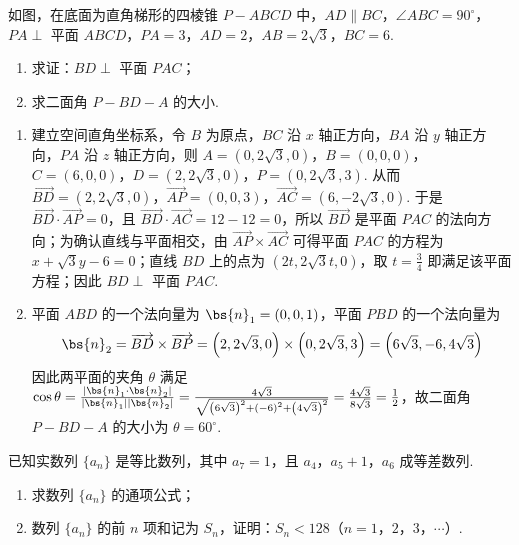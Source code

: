 \begin{problem}
如图，在底面为直角梯形的四棱锥 \(P - ABCD\) 中，\(AD \parallel BC\)，\(\angle ABC = 90^{\circ}\)，\(PA \perp\) 平面 \(ABCD\)，\(PA = 3\)，\(AD = 2\)，\(AB = 2\sqrt{3}\)，\(BC = 6\).

\begin{enumerate}
\item 求证：\(BD \perp\) 平面 \(PAC\)；
\item 求二面角 \(P - BD - A\) 的大小.
\end{enumerate}

\end{problem}

\begin{solution}
\begin{enumerate}
\item 建立空间直角坐标系，令 \(B\) 为原点，\(BC\) 沿 \(x\) 轴正方向，\(BA\) 沿 \(y\) 轴正方向，\(PA\) 沿 \(z\) 轴正方向，则 \(A=\left(0,2\sqrt{3},0\right)\)，\(B=\left(0,0,0\right)\)，\(C=\left(6,0,0\right)\)，\(D=\left(2,2\sqrt{3},0\right)\)，\(P=\left(0,2\sqrt{3},3\right)\).
从而 \(\overrightarrow{BD}=\left(2,2\sqrt{3},0\right)\)，\(\overrightarrow{AP}=\left(0,0,3\right)\)，\(\overrightarrow{AC}=\left(6,-2\sqrt{3},0\right)\). 于是 \(\overrightarrow{BD}\cdot\overrightarrow{AP}=0\)，且 \(\overrightarrow{BD}\cdot\overrightarrow{AC}=12-12=0\)，所以 \(\overrightarrow{BD}\) 是平面 \(PAC\) 的法向方向；为确认直线与平面相交，由 \(\overrightarrow{AP}\times\overrightarrow{AC}\) 可得平面 \(PAC\) 的方程为 \(x+\sqrt{3}y-6=0\)；直线 \(BD\) 上的点为 \(\left(2t,2\sqrt{3}t,0\right)\)，取 \(t=\frac34\) 即满足该平面方程；因此 \(BD\perp\) 平面 \(PAC\).
\item 平面 \(ABD\) 的一个法向量为 \(\bs{n}_1=\left(0,0,1\right)\)，平面 \(PBD\) 的一个法向量为
\[
\bs{n}_2=\overrightarrow{BD}\times\overrightarrow{BP}=\left(2,2\sqrt{3},0\right)\times\left(0,2\sqrt{3},3\right)=\left(6\sqrt{3},-6,4\sqrt{3}\right)
\]
因此两平面的夹角 \(\theta\) 满足 \(\cos\theta=\frac{|\bs{n}_1\cdot\bs{n}_2|}{|\bs{n}_1||\bs{n}_2|}=\frac{4\sqrt{3}}{\sqrt{\left(6\sqrt{3}\right)^2+\left(-6\right)^2+\left(4\sqrt{3}\right)^2}}=\frac{4\sqrt{3}}{8\sqrt{3}}=\frac12\)，故二面角 \(P-BD-A\) 的大小为 \(\theta=60^{\circ}\).
\end{enumerate}
\end{solution}

\begin{problem}
已知实数列 \(\{a_n\}\) 是等比数列，其中 \(a_7 = 1\)，且 \(a_4\)，\(a_5 + 1\)，\(a_6\) 成等差数列.

\begin{enumerate}
\item 求数列 \(\{a_n\}\) 的通项公式；
\item 数列 \(\{a_n\}\) 的前 \(n\) 项和记为 \(S_n\)，证明：\(S_n < 128\)（\(n = 1\)，\(2\)，\(3\)，\(\cdots\)）.
\end{enumerate}
\end{problem}

